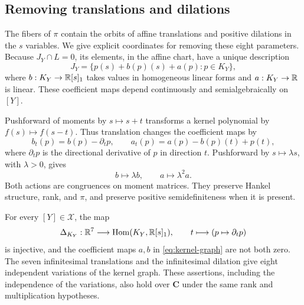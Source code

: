 \subsection{Removing translations and dilations}

The fibers of $\pi$ contain the orbits of affine translations and
positive dilations in the $s$ variables. We give explicit coordinates
for removing these eight parameters. Because $J_Y\cap L=0$, its
elements, in the affine chart, have a unique description
\begin{equation}
\label{eq:kernel-graph}
 J_Y=\{p(s)+b(p)(s)+a(p):p\in K_Y\},
\end{equation}
where $b:K_Y\to\mathbb R[s]_1$ takes values in homogeneous linear forms and
$a:K_Y\to\mathbb R$ is linear. These coefficient maps depend continuously
and semialgebraically on $[Y]$.

Pushforward of moments by $s\mapsto s+t$ transforms a kernel
polynomial by $f(s)\mapsto f(s-t)$. Thus translation changes the
coefficient maps by
\begin{equation}
\label{eq:translation-kernel-coefficients}
 b_t(p)=b(p)-\partial_t p,
 \qquad
 a_t(p)=a(p)-b(p)(t)+p(t),
\end{equation}
where $\partial_t p$ is the directional derivative of $p$ in direction
$t$. Pushforward by $s\mapsto\lambda s$, with $\lambda>0$, gives
\begin{equation}
\label{eq:dilation-kernel-coefficients}
 b\longmapsto\lambda b,
 \qquad a\longmapsto\lambda^2 a.
\end{equation}
Both actions are congruences on moment matrices. They preserve Hankel
structure, rank, and $\pi$, and preserve positive semidefiniteness when
it is present.

\begin{lemma}
\label{lem:kernel-affine-action}
For every $[Y]\in\mathcal X$, the map
\[
 \Delta_{K_Y}:\mathbb R^7\longrightarrow
   \operatorname{Hom}(K_Y,\mathbb R[s]_1),
 \qquad t\longmapsto(p\mapsto\partial_t p)
\]
is injective, and the coefficient maps $a,b$ in
\eqref{eq:kernel-graph} are not both zero. The seven infinitesimal
translations and the infinitesimal dilation give eight independent
variations of the kernel graph. These assertions, including the
independence of the variations, also hold over $\mathbf C$ under the
same rank and multiplication hypotheses.
\end{lemma}

